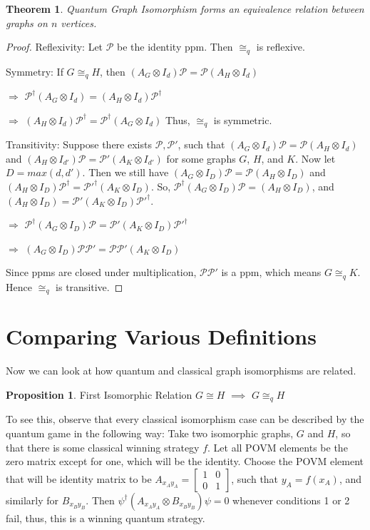 \documentclass[12pt]{article}
\newtheorem{Theorem}{Theorem}
\theoremstyle{definition}
\theoremstyle{proposition}
\newtheorem{proposition}{Proposition}[section]
\theoremstyle{lemma}
\begin{document}
\begin{Theorem}
Quantum Graph Isomorphism forms an equivalence relation between graphs on $n$ vertices.
\end{Theorem}
\begin{proof}
Reflexivity: Let $\mathcal{P}$ be the identity ppm. Then $\cong_q$ is reflexive.

Symmetry: If $G \cong_q H$, then $(A_G \otimes I_d)\mathcal{P} = \mathcal{P} (A_H \otimes I_d)$

$\Rightarrow$ $\mathcal{P}^\dag (A_G \otimes I_d) = (A_H \otimes I_d) \mathcal{P}^\dag$

$\Rightarrow$ $(A_H \otimes I_d) \mathcal{P}^\dag = \mathcal{P}^\dag (A_G \otimes I_d)$
Thus, $\cong_q$ is symmetric.


Transitivity: Suppose there exists $\mathcal{P}, \mathcal{P}'$, such that $(A_G \otimes I_d)\mathcal{P} = \mathcal{P} (A_H \otimes I_d)$ and $(A_H \otimes I_{d'}) \mathcal{P} = \mathcal{P}' (A_K \otimes I_{d'})$ for some graphs $G$, $H$, and $K$. Now let $D = max(d, d')$. Then we still have $(A_G \otimes I_D)\mathcal{P} = \mathcal{P} (A_H \otimes I_D)$ and $(A_H \otimes I_{D}) \mathcal{P}^\dag = \mathcal{P}'^\dag (A_K \otimes I_{D})$. So, $\mathcal{P}^\dag (A_G \otimes I_D)\mathcal{P} = (A_H \otimes I_D)$, and $(A_H \otimes I_D) = \mathcal{P}' (A_K \otimes I_{D}) \mathcal{P}'^\dag$. 

$\Rightarrow$ $\mathcal{P}^\dag (A_G \otimes I_D)\mathcal{P} = \mathcal{P}' (A_K \otimes I_{D}) \mathcal{P}'^\dag$

$\Rightarrow$ $(A_G \otimes I_D)\mathcal{P} \mathcal{P}' = \mathcal{P} \mathcal{P}' (A_K \otimes I_{D})$

Since ppms are closed under multiplication, $\mathcal{P} \mathcal{P}'$ is a ppm, which means $G \cong_q K$. Hence $\cong_q$ is transitive.
\end{proof}


\section{Comparing Various Definitions}
Now we can look at how quantum and classical graph isomorphisms are related.


\begin{proposition}{First Isomorphic Relation}
\label{prop:isoimpliesqiso}
$G \cong H$ $\implies$ $G \cong_q H$
\end{proposition}
To see this, observe that every classical isomorphism case can be described by the quantum game in the following way: Take two isomorphic graphs, $G$ and $H$, so that there is some classical winning strategy $f$. Let all POVM elements be the zero matrix except for one, which will be the identity. Choose the POVM element that will be identity matrix to be $A_{x_Ay_A} = 
\begin{bmatrix}
1 & 0 \\
0 & 1
\end{bmatrix}$, such that $y_A = f(x_A)$, and similarly for $B_{x_By_B}$. Then $\psi^\dag(A_{x_Ay_A} \otimes B_{x_By_B})\psi = 0$ whenever conditions 1 or 2 fail, thus, this is a winning quantum strategy.
\end{document}
